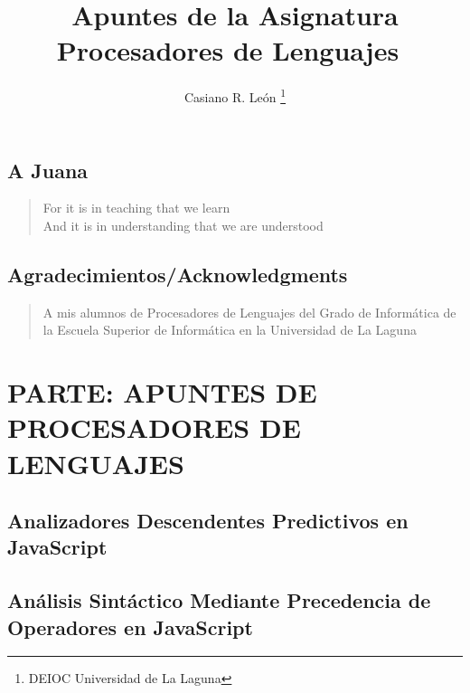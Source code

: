 \documentclass[11pt,a4paper,oneside,onecolumn]{book}
\title{Apuntes de la Asignatura Procesadores de Lenguajes\
  }
\author{Casiano R. León \thanks{DEIOC Universidad de La Laguna}}
\begin{document}
\topmargin=5pt
\maketitle


\tableofcontents 
\listoffigures
\listoftables


\chapter*{A Juana}
\vspace{8cm}
{\it
\begin{Large}
\begin{verse}
\flushright 
For it is in teaching that we learn\\
And it is in understanding that we are understood
\end{verse}
\end{Large}
}

\chapter*{Agradecimientos/Acknowledgments}
\begin{verse}

A mis alumnos de 
Procesadores de Lenguajes del Grado de Informática
de la Escuela Superior de Informática en la Universidad de La Laguna
\end{verse}




\part{PARTE: APUNTES DE PROCESADORES DE LENGUAJES}



%

%

%

\chapter{Analizadores Descendentes Predictivos en JavaScript}
  

\chapter{Análisis Sintáctico Mediante Precedencia de Operadores en JavaScript}
\end{document}
